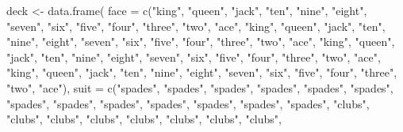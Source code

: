 \documentclass[
  letterpaper,
  DIV=11,
  numbers=noendperiod]{scrbook}
\newenvironment{Shaded}{\begin{snugshade}}{\end{snugshade}}
\newcommand{\AttributeTok}[1]{\textcolor[rgb]{0.40,0.45,0.13}{#1}}
\newcommand{\FunctionTok}[1]{\textcolor[rgb]{0.28,0.35,0.67}{#1}}
\newcommand{\NormalTok}[1]{\textcolor[rgb]{0.00,0.23,0.31}{#1}}
\newcommand{\OtherTok}[1]{\textcolor[rgb]{0.00,0.23,0.31}{#1}}
\newcommand{\StringTok}[1]{\textcolor[rgb]{0.13,0.47,0.30}{#1}}
\begin{document}
\begin{Shaded}
\begin{Highlighting}[]
\NormalTok{deck }\OtherTok{\textless{}{-}} \FunctionTok{data.frame}\NormalTok{(}
  \AttributeTok{face =} \FunctionTok{c}\NormalTok{(}\StringTok{"king"}\NormalTok{, }\StringTok{"queen"}\NormalTok{, }\StringTok{"jack"}\NormalTok{, }\StringTok{"ten"}\NormalTok{, }\StringTok{"nine"}\NormalTok{, }\StringTok{"eight"}\NormalTok{, }\StringTok{"seven"}\NormalTok{, }\StringTok{"six"}\NormalTok{,}
    \StringTok{"five"}\NormalTok{, }\StringTok{"four"}\NormalTok{, }\StringTok{"three"}\NormalTok{, }\StringTok{"two"}\NormalTok{, }\StringTok{"ace"}\NormalTok{, }\StringTok{"king"}\NormalTok{, }\StringTok{"queen"}\NormalTok{, }\StringTok{"jack"}\NormalTok{, }\StringTok{"ten"}\NormalTok{, }
    \StringTok{"nine"}\NormalTok{, }\StringTok{"eight"}\NormalTok{, }\StringTok{"seven"}\NormalTok{, }\StringTok{"six"}\NormalTok{, }\StringTok{"five"}\NormalTok{, }\StringTok{"four"}\NormalTok{, }\StringTok{"three"}\NormalTok{, }\StringTok{"two"}\NormalTok{, }\StringTok{"ace"}\NormalTok{, }
    \StringTok{"king"}\NormalTok{, }\StringTok{"queen"}\NormalTok{, }\StringTok{"jack"}\NormalTok{, }\StringTok{"ten"}\NormalTok{, }\StringTok{"nine"}\NormalTok{, }\StringTok{"eight"}\NormalTok{, }\StringTok{"seven"}\NormalTok{, }\StringTok{"six"}\NormalTok{, }\StringTok{"five"}\NormalTok{, }
    \StringTok{"four"}\NormalTok{, }\StringTok{"three"}\NormalTok{, }\StringTok{"two"}\NormalTok{, }\StringTok{"ace"}\NormalTok{, }\StringTok{"king"}\NormalTok{, }\StringTok{"queen"}\NormalTok{, }\StringTok{"jack"}\NormalTok{, }\StringTok{"ten"}\NormalTok{, }\StringTok{"nine"}\NormalTok{, }
    \StringTok{"eight"}\NormalTok{, }\StringTok{"seven"}\NormalTok{, }\StringTok{"six"}\NormalTok{, }\StringTok{"five"}\NormalTok{, }\StringTok{"four"}\NormalTok{, }\StringTok{"three"}\NormalTok{, }\StringTok{"two"}\NormalTok{, }\StringTok{"ace"}\NormalTok{),  }
  \AttributeTok{suit =} \FunctionTok{c}\NormalTok{(}\StringTok{"spades"}\NormalTok{, }\StringTok{"spades"}\NormalTok{, }\StringTok{"spades"}\NormalTok{, }\StringTok{"spades"}\NormalTok{, }\StringTok{"spades"}\NormalTok{, }\StringTok{"spades"}\NormalTok{, }
    \StringTok{"spades"}\NormalTok{, }\StringTok{"spades"}\NormalTok{, }\StringTok{"spades"}\NormalTok{, }\StringTok{"spades"}\NormalTok{, }\StringTok{"spades"}\NormalTok{, }\StringTok{"spades"}\NormalTok{, }\StringTok{"spades"}\NormalTok{, }
    \StringTok{"clubs"}\NormalTok{, }\StringTok{"clubs"}\NormalTok{, }\StringTok{"clubs"}\NormalTok{, }\StringTok{"clubs"}\NormalTok{, }\StringTok{"clubs"}\NormalTok{, }\StringTok{"clubs"}\NormalTok{, }\StringTok{"clubs"}\NormalTok{, }\StringTok{"clubs"}\NormalTok{, }

\end{Highlighting}
\end{Shaded}
\end{document}
